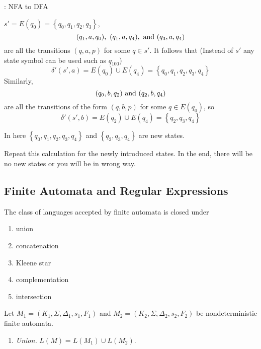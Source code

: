 \begin{multicols}{2}
\begin{example}{: NFA to DFA}
  \hfill\break

  $s' = E(q_0) = \left\{ q_0, q_1, q_2, q_3  \right\}$,
  \begin{equation*}
    (q_1, a, q_0),\ (q_1, a, q_4), \textnormal{ and } (q_3, a, q_4)
  \end{equation*}
  are all the transitions $(q, a, p)$ for some $q \in s'$. It follows that (Instead of $s'$ any state symbol can be used such as $q_{100}$)
  \begin{equation*}
    \delta'(s', a) = E(q_0) \cup E(q_4) = \left\{ q_0, q_1, q_2, q_3, q_4 \right\}
  \end{equation*}
  Similarly,
  \begin{equation*}
    (q_0, b, q_2) \textnormal{ and } (q_2, b, q_4)
  \end{equation*}
  are all the transitions of the form $(q, b, p)$ for some $q \in E(q_0)$, so
  \begin{equation*}
    \delta'(s', b) = E(q_2) \cup E(q_4) = \left\{ q_2, q_3, q_4 \right\}
  \end{equation*}
  
  In here $\left\{ q_0, q_1, q_2, q_3, q_4 \right\}$ and $\left\{ q_2, q_3, q_4 \right\}$ are new states.
  
  Repeat this calculation for the newly introduced states. In the end, there will be no new states or you will be in wrong way.
\end{example}


\subsection{Finite Automata and Regular Expressions}

\begin{theorem}{}
  The class of languages accepted by finite automata is closed under
  \begin{enumerate}[label=\alph*)]
    \item union
    \item concatenation
    \item Kleene star
    \item complementation
    \item intersection
  \end{enumerate}
\end{theorem}

Let $M_1 = (K_1, \Sigma, \Delta_1, s_1, F_1)$ and $M_2 = (K_2, \Sigma, \Delta_2, s_2, F_2)$ be nondeterministic finite automata.

\begin{enumerate}[label=(\alph*)]
  \item \textit{Union.}
  $L(M) = L(M_1) \cup L(M_2)$.
  

\end{enumerate}
\end{multicols}
